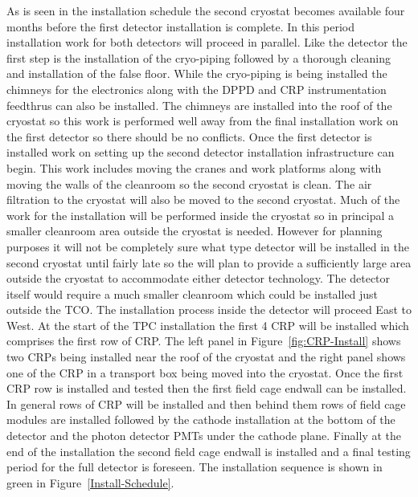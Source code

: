 As is seen in the installation schedule the second cryostat becomes
available four months before the first detector installation is
complete. In this period installation work for both detectors will
proceed in parallel. Like the  detector the first step is
the installation of the cryo-piping followed by a thorough cleaning
and installation of the false floor. While the cryo-piping is being
installed the  chimneys for the electronics along with the
DPPD and CRP instrumentation feedthrus can also be installed. The
chimneys are installed into the roof of the cryostat so this work is
performed well away from the final installation work on the first
detector so there should be no conflicts. Once the first detector is
installed work on setting up the second detector installation
infrastructure can begin. This work includes moving the cranes and
work platforms along with moving the walls of the cleanroom so the
second cryostat is clean. The air filtration to the cryostat will also
be moved to the second cryostat.  Much of the work for the 
installation will be performed inside the cryostat so in principal a
smaller cleanroom area outside the cryostat is needed. However for
planning purposes it will not be completely sure what type detector
will be installed in the second cryostat until fairly late so the 
will plan to provide a sufficiently large area outside the cryostat to
accommodate either detector technology.  The detector itself
would require a much smaller cleanroom which could be installed just
outside the TCO. The installation process inside the detector will
proceed East to West. At the start of the TPC installation the first
\num{4} CRP will be installed which comprises the first row of
CRP. The left panel in Figure~\ref{fig:CRP-Install} shows two CRPs
being installed near the roof of the cryostat and the right panel
shows one of the CRP in a transport box being moved into the cryostat.
Once the first CRP row is installed and tested then the first field
cage endwall can be installed. In general rows of CRP will be
installed and then behind them rows of field cage modules are
installed followed by the cathode installation at the bottom of the
detector and the photon detector PMTs under the cathode plane. Finally
at the end of the installation the second field cage endwall is
installed and a final testing period for the full detector is
foreseen. The  installation sequence is shown in green in
Figure~\ref{Install-Schedule}.
